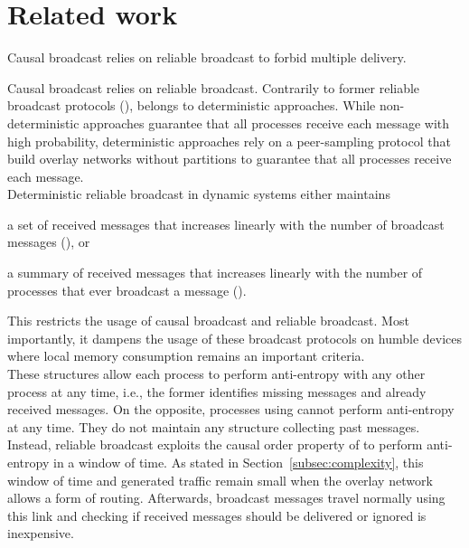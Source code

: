 
\section{Related work}
\label{sec:relatedwork}

Causal broadcast relies on reliable broadcast to forbid multiple delivery.







Causal broadcast relies on reliable broadcast. 
Contrarily to former reliable broadcast protocols (\REF), \RPCBROADCAST belongs
to deterministic approaches. While non-deterministic approaches guarantee that
all processes receive each message with high probability, deterministic
approaches rely on a peer-sampling protocol that build overlay networks without
partitions to guarantee that all processes receive each message. \\
Deterministic reliable broadcast in dynamic systems either maintains
\begin{inparaenum}[(i)]
\item a set of received messages that increases linearly with the number of
  broadcast messages (\REF), or
\item a summary of received messages that increases linearly with the number of
  processes that ever broadcast a message (\REF). 
\end{inparaenum}
This restricts the usage of causal broadcast and reliable broadcast. Most
importantly, it dampens the usage of these broadcast protocols on humble devices
where local memory consumption remains an important criteria. \\
These structures allow each process to perform anti-entropy with any other
process at any time, i.e., the former identifies missing messages and already
received messages. On the opposite, processes using \RPCBROADCAST cannot perform
anti-entropy at any time. They do not maintain any structure collecting past
messages. Instead, reliable broadcast exploits the causal order property of
\RPCBROADCAST to perform anti-entropy in a window of time. As stated in
Section~\ref{subsec:complexity}, this window of time and generated traffic
remain small when the overlay network allows a form of routing. Afterwards,
broadcast messages travel normally using this link and checking if received
messages should be delivered or ignored is inexpensive.

